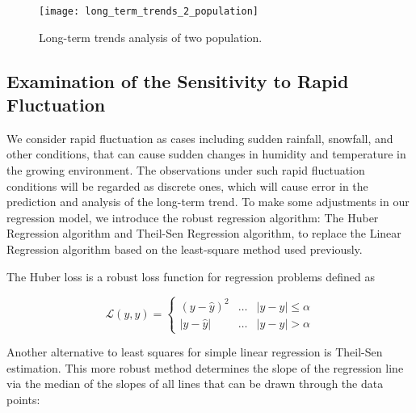 \documentclass{mcmthesis}
\begin{document}
\begin{figure}[H]
  \small
  \centering
  \texttt{[image: long\_term\_trends\_2\_population]}
  \caption{Long-term trends analysis of two population.}
  \label{long_term_trends_2_population}
\end{figure}

\subsection{Examination of the Sensitivity to Rapid Fluctuation}

We consider rapid fluctuation as cases including sudden rainfall, snowfall, and other conditions, that can cause sudden changes in humidity and temperature in the growing environment. The observations under such rapid fluctuation conditions will be regarded as discrete ones, which will cause error in the prediction and analysis of the long-term trend. To make some adjustments  in our regression model, we introduce the robust regression algorithm: The Huber Regression algorithm and Theil-Sen Regression algorithm, to replace the Linear Regression algorithm based on the least-square method used previously.

The Huber loss\cite{huber_regression} is a robust loss function for regression problems defined as

\begin{equation}
  \mathcal{L}(y, \hat{y})=\left\{\begin{array}{lll}
  (y-\hat{y})^{2} & \ldots & |y-\hat{y}| \leq \alpha \\
  |y-\hat{y}| & \ldots & |y-\hat{y}|>\alpha
  \end{array}\right.
\end{equation}


Another alternative to least squares for simple linear regression is Theil-Sen estimation\cite{theil_sen_regression}. This more robust method determines the slope of the regression line via the median of the slopes of all lines that can be drawn through the data points:
\end{document}
